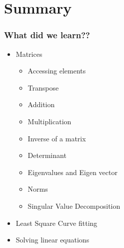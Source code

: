 \documentclass[14pt,compress]{beamer}
\begin{document}
\section{Summary}
\begin{frame}
  \frametitle{What did we learn??}
  \begin{itemize}
  \item Matrices
    \begin{itemize}
      \item Accessing elements
      \item Transpose
      \item Addition
      \item Multiplication
      \item Inverse of a matrix
      \item Determinant
      \item Eigenvalues and Eigen vector
      \item Norms
      \item Singular Value Decomposition
    \end{itemize}
  \item Least Square Curve fitting
  \item Solving linear equations
  \end{itemize}
\end{frame}
\end{document}
